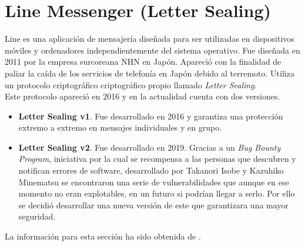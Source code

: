 \section{Line Messenger (Letter Sealing)}
Line es una aplicación de mensajería diseñada para ser utilizadas en dispositivos móviles y ordenadores independientemente del sistema operativo. Fue diseñada en 2011 por la empresa surcoreana NHN en Japón.
Apareció con la finalidad de paliar la caída de los servicios de telefonía en Japón debido al terremoto. Utiliza un protocolo criptográfico criptográfico propio llamado \emph{Letter Sealing}.\\
Este protocolo apareció en 2016 y en la actualidad cuenta con dos versiones.
\begin{itemize}
	\item \textbf{Letter Sealing v1}. Fue desarrollado en 2016 y garantiza una protección extremo a extremo en mensajes individuales y en grupo.
	\item \textbf{Letter Sealing v2}. Fue desarrollado en 2019. Gracias a un \emph{Bug Bounty  Program}, iniciativa por la cual se recompensa a las personas que descubren y notifican errores de software,  desarrollado por Takanori Isobe y Kazuhiko Minematsu se encontraron una serie de vulnerabilidades que aunque en ese momento no eran explotables, en un futuro si podrían llegar a serlo. Por ello se decidió desarrollar una nueva versión de este que garantizara una mayor seguridad.
\end{itemize}
La información para esta sección ha sido obtenida de \cite{line}.
\begin{table}[htb]
	\label{table:lsv}
	\caption{Tabla comparativa de versiones de Letter Sealing.}
\end{table}

